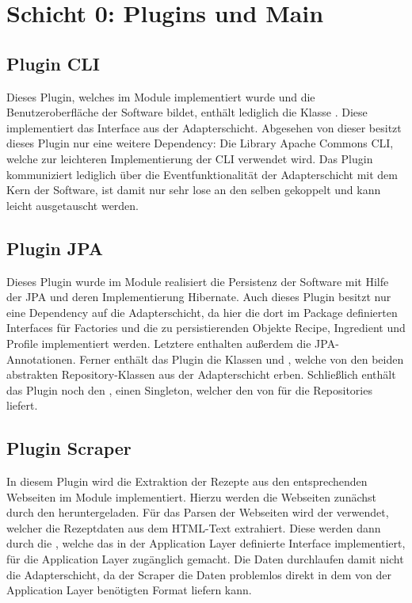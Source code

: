 \section{Schicht 0: Plugins und Main}

\subsection{Plugin CLI}
Dieses Plugin, welches im Module  implementiert wurde und die Benutzeroberfläche der Software bildet, enthält lediglich die Klasse . Diese implementiert das Interface  aus der Adapterschicht. Abgesehen von dieser besitzt dieses Plugin nur eine weitere Dependency: Die Library Apache Commons CLI, welche zur leichteren Implementierung der CLI verwendet wird. Das Plugin kommuniziert lediglich über die Eventfunktionalität der Adapterschicht mit dem Kern der Software, ist damit nur sehr lose an den selben gekoppelt und kann leicht ausgetauscht werden.

\subsection{Plugin JPA}
Dieses Plugin wurde im Module  realisiert die Persistenz der Software mit Hilfe der \ac{JPA} und deren Implementierung Hibernate. Auch dieses Plugin besitzt nur eine Dependency auf die Adapterschicht, da hier die dort im Package  definierten Interfaces für Factories und die zu persistierenden Objekte Recipe, Ingredient und Profile implementiert werden. Letztere enthalten außerdem die \ac{JPA}-Annotationen. Ferner enthält das Plugin die Klassen  und , welche von den beiden abstrakten Repository-Klassen aus der Adapterschicht erben. Schließlich enthält das Plugin noch den , einen Singleton, welcher den  von  für die Repositories liefert.

\subsection{Plugin Scraper}
In diesem Plugin wird die Extraktion der Rezepte aus den entsprechenden Webseiten im Module  implementiert. Hierzu werden die Webseiten zunächst durch den  heruntergeladen. Für das Parsen der Webseiten wird der  verwendet, welcher die Rezeptdaten aus dem HTML-Text extrahiert. Diese werden dann durch die , welche das in der Application Layer definierte Interface  implementiert, für die Application Layer zugänglich gemacht. Die Daten durchlaufen damit nicht die Adapterschicht, da der Scraper die Daten problemlos direkt in dem von der Application Layer benötigten Format liefern kann.

